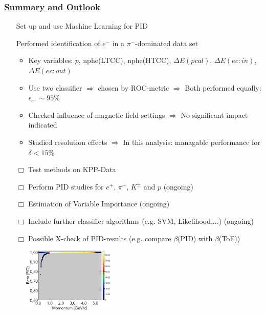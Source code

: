 \documentclass[xcolor=table, xcolor=dvipsnames]{beamer}
\begin{document}
\begin{frame}
 \frametitle{\hyperlink{con}{Summary and Outlook}}
 \label{fin}
 \footnotesize
 
 \begin{itemize}
 \item[\CheckedBox] Set up  and use Machine Learning for PID
  \item[\CheckedBox] Performed identification of $e^{-}$ in a $\pi^{-}$-dominated data set
  \begin{itemize}
  \scriptsize
    \item Key variables: $p$, nphe(LTCC), nphe(HTCC), $\Delta E(pcal)$, $\Delta E(ec:in)$, $\Delta E(ec:out)$
    \item Use two classifier $\Rightarrow$ chosen by ROC-metric $\Rightarrow$ Both performed equally: $\epsilon_{e^{-}} \sim 95\%$
    \item Checked influence of magnetic field settings $\Rightarrow$ No significant impact indicated
    \item Studied resolution effects $\Rightarrow$ In this analysis: managable performance for $\delta < 15\%$
  \end{itemize}
  \item[$\Box$] Test methods on KPP-Data
  \item[$\Box$] Perform PID studies for $e^{+}$, $\pi^{+}$, $K^{\pm}$ and $p$ (ongoing)
  \item[$\Box$] Estimation of Variable Importance (ongoing)
  \item[$\Box$] Include further classifier algorithms (e.g. SVM, Likelihood,...) (ongoing)
  \item[$\Box$] Possible X-check of PID-results (e.g. compare $\beta$(PID) with $\beta$(ToF))
 \end{itemize}
 
 \begin{figure}
 \includegraphics[width=0.4\textwidth]{betaVsMom.png}
 \end{figure}
\end{frame}
\end{document}
